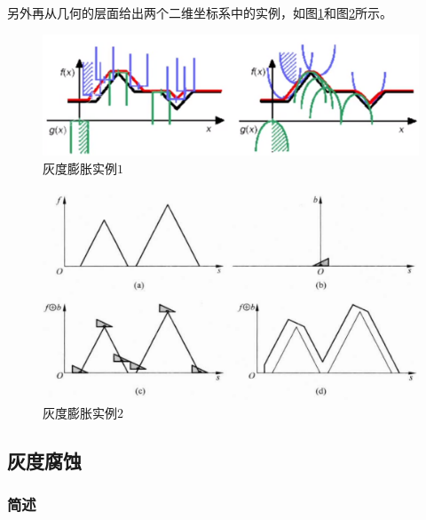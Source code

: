 \documentclass[UTF8]{ctexart}
\begin{document}
                \indent 另外再从几何的层面给出两个二维坐标系中的实例，如图\ref{grey_dilation1}和图\ref{grey_dilation2}所示。
                
                 			\begin{figure}[H]
                 				\centering 
                      			\includegraphics[scale=0.35]{grey_dilation1.png} 
                 				\caption{灰度膨胀实例$1$} 
                 				\label{grey_dilation1}
                 			\end{figure}
             
                 			\begin{figure}[H]
                 				\centering 
                      			\includegraphics[scale=0.35]{grey_dilation2.png} 
                 				\caption{灰度膨胀实例$2$} 
                 				\label{grey_dilation2}
                 			\end{figure}                             
            
        \subsection{灰度腐蚀}
            
            \subsubsection{简述}
            
\end{document}
